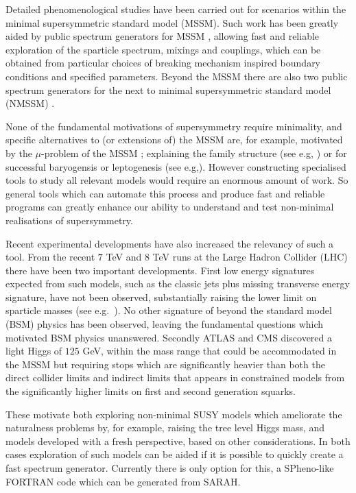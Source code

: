 \documentclass[final,3p,11pt,pdflatex]{elsarticle}
\makeatletter
\newcommand{\sarah}{SARAH\@\xspace}
\makeatother
\begin{document}
Detailed phenomenological studies have been carried out for scenarios
within the minimal supersymmetric standard model (MSSM).  Such work
has been greatly aided by public spectrum generators for
MSSM \cite{Allanach:2001kg,Porod:2003um,Djouadi:2002ze,Baer:1993ae,Chowdhury:2011zr},
allowing fast and reliable exploration of the sparticle spectrum,
mixings and couplings, which can be obtained from particular choices
of breaking mechanism inspired boundary conditions and specified
parameters. Beyond the MSSM there are also two public spectrum
generators \cite{Ellwanger:2006rn,Allanach:2013kza} for the next to
minimal supersymmetric standard model (NMSSM) \cite{NMSSM}.

None of the fundamental motivations of supersymmetry require
minimality, and specific alternatives to (or extensions of) the MSSM
are, for example, motivated by the $\mu$-problem of the
MSSM \cite{Kim:1983dt}; explaining the family structure (see e.g,
\cite{King:2014nza}) or for successful baryogensis or leptogenesis
(see e.g,\cite{King:2008qb}). However constructing specialised tools
to study all relevant models would require an enormous amount of work.
So general tools which can automate this process and produce fast and
reliable programs can greatly enhance our ability to understand and
test non-minimal realisations of supersymmetry.

Recent experimental developments have also increased the relevancy of
such a tool. From the recent $7$ TeV and $8$ TeV runs at the Large
Hadron Collider (LHC) there have been two important developments.
First low energy signatures expected from such models, such as the
classic jets plus missing transverse energy signature, have not been
observed, substantially raising the lower limit on sparticle masses
(see e.g.~\cite{Aad:2013wta,Chatrchyan:2014lfa}). No other signature
of beyond the standard model (BSM) physics has been observed, leaving
the fundamental questions which motivated BSM physics
unanswered. Secondly ATLAS and CMS discovered \cite{ATLAS:2012ae,
  Chatrchyan:2012tx} a light Higgs of $125$ GeV, within the mass range
that could be accommodated in the MSSM but requiring stops which are
significantly heavier than both the direct collider limits and
indirect limits that appears in constrained models from the
significantly higher limits on first and second generation squarks.

These motivate both exploring non-minimal SUSY models which ameliorate
the naturalness problems by, for example, raising the tree level Higgs
mass, and models developed with a fresh perspective, based on other
considerations.  In both cases exploration of such models can be aided
if it is possible to quickly create a fast spectrum generator.
Currently there is only option for this, a SPheno-like FORTRAN code
which can be generated from
\sarah \cite{Staub:2010ty,Staub:2009bi,Staub:2010jh,Staub:2012pb,Staub:2013tta}.
\end{document}

